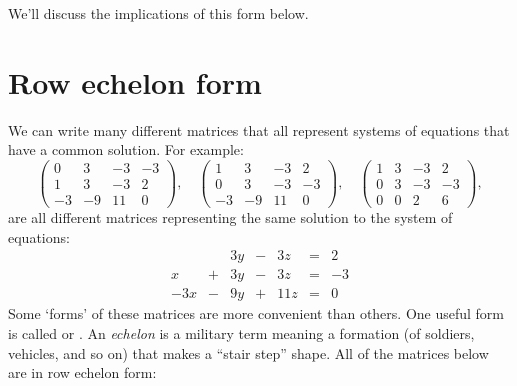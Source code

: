 \documentclass{ximera}
\begin{document}
We'll discuss the implications of this form below.


\section{Row echelon form}

We can write many different matrices that all represent systems
of equations that have a common solution. For example:
\[
\begin{pmatrix}
 0 &   3 & -3 & -3 \\
  1 &   3 & -3 & 2  \\
  -3& -9  & 11 & 0
\end{pmatrix},
\quad
\begin{pmatrix}
  1 &   3 & -3 & 2  \\
  0 &   3 & -3 & -3 \\
  -3& -9  & 11 & 0
\end{pmatrix},
\quad
\begin{pmatrix}
  1 &   3 & -3 & 2  \\
  0 &   3 & -3 & -3 \\
  0& 0  & 2 & 6
\end{pmatrix},
\]
are all different matrices representing the same solution to the
system of equations:
\[
\begin{array}{ccccccc}
       & & 3y &-& 3z &=& 2 \\
     x& +&3y&-&3z&=&-3\\
     -3x& -&9y&+&11z&=&0
\end{array}
\]
Some `forms' of these matrices are more convenient than others. One
useful form is called  or . An \textit{echelon} is a military term meaning a formation
(of soldiers, vehicles, and so on) that makes a ``stair step''
shape. All of the matrices below are in row echelon form:
\end{document}
